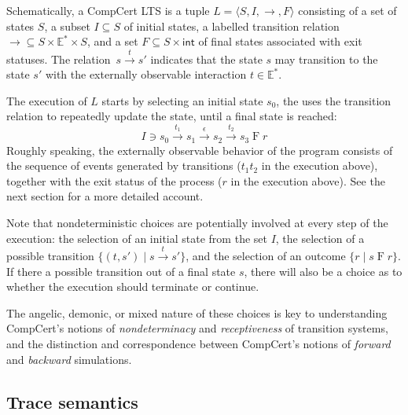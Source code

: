 \documentclass[11pt,oneside,draft]{book}
\theoremstyle{definition}
\newcommand{\kw}[1]{\ensuremath{ \mathsf{#1} }}
\begin{document}
Schematically, a CompCert LTS
is a tuple
$L = \langle S, I, {\rightarrow}, F \rangle$
consisting of
a set of states $S$,
a subset $I \subseteq S$ of initial states,
a labelled transition relation
${\rightarrow} \subseteq S \times \mathbb{E}^* \times S$,
and a set
$F \subseteq S \times \kw{int}$
of final states associated with exit statuses.
The relation~$s \stackrel{t}{\rightarrow} s'$
indicates that the state $s$ may transition to the state $s'$
with the externally observable interaction $t \in \mathbb{E}^*$.

The execution of $L$ starts by selecting an initial state $s_0$,
the uses the transition relation to repeatedly update the state,
until a final state is reached:
\[
  I \ni s_0
  \xrightarrow{t_1} s_1
  \xrightarrow{\epsilon} s_2
  \xrightarrow{t_2} s_3
  \mathrel{F} r
\]
Roughly speaking,
the externally observable behavior of the program
consists of the sequence of events generated by transitions
($t_1 t_2$ in the execution above),
together with the exit status of the process
($r$ in the execution above).
See the next section for a more detailed account.

Note that nondeterministic choices
are potentially involved at every step of the execution:
the selection of an initial state from the set $I$,
the selection of a possible transition $\{ (t, s') \mid s \xrightarrow{t} s' \}$,
and the selection of an outcome $\{ r \mid s \mathrel{F} r \}$.
If there a possible transition out of a final state $s$,
there will also be a choice as to whether the execution should terminate
or continue.

The angelic, demonic, or mixed nature of these choices
is key to understanding CompCert's
notions of \emph{nondeterminacy} and \emph{receptiveness}
of transition systems,
and the distinction and correspondence between
CompCert's notions of \emph{forward} and \emph{backward} simulations.

\subsection{Trace semantics}
\end{document}
